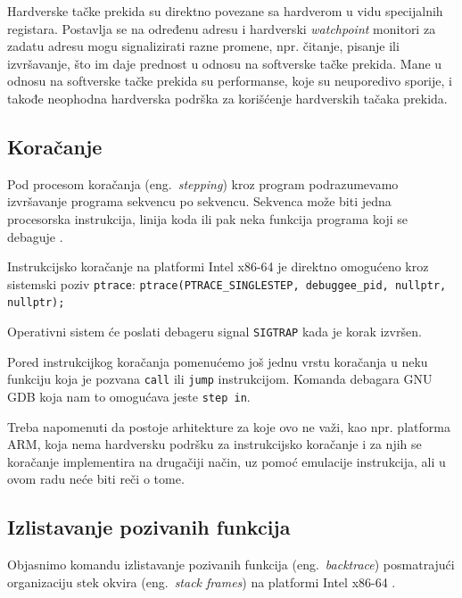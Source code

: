 \documentclass[12pt,oneside]{memoir}
\begin{document}
Hardverske tačke prekida su direktno povezane sa hardverom u vidu specijalnih registara. Postavlja se na određenu adresu i hardverski \emph{watchpoint} monitori za zadatu adresu mogu signalizirati razne promene, npr. čitanje, pisanje ili izvršavanje, što im daje prednost u odnosu na softverske tačke prekida. Mane u odnosu na softverske tačke prekida su performanse, koje su neuporedivo sporije, i takođe neophodna hardverska podrška za korišćenje hardverskih tačaka prekida.

\subsection{Koračanje}

Pod procesom koračanja (eng.~\emph{stepping}) kroz program podrazumevamo izvršavanje programa sekvencu po sekvencu. Sekvenca može biti jedna procesorska instrukcija, linija koda ili pak neka funkcija programa koji se debaguje \cite{GDB}.

Instrukcijsko koračanje na platformi Intel x86-64 je direktno omogućeno kroz sistemski poziv \texttt{ptrace}:\newline\newline
\texttt{ptrace(PTRACE\_SINGLESTEP, debuggee\_pid, nullptr, nullptr);}
\newline

Operativni sistem će poslati debageru signal \texttt{SIGTRAP} kada je korak izvršen.

Pored instrukcijkog koračanja pomenućemo još jednu vrstu koračanja u neku funkciju koja je pozvana \texttt{call} ili \texttt{jump} instrukcijom. Komanda debagara GNU GDB koja nam to omogućava jeste \texttt{step in}.

Treba napomenuti da postoje arhitekture za koje ovo ne važi, kao npr. platforma ARM, koja nema hardversku podršku za instrukcijsko koračanje i za njih se koračanje implementira na drugačiji način, uz pomoć emulacije instrukcija, ali u ovom radu neće biti reči o tome.

\subsection{Izlistavanje pozivanih funkcija}

Objasnimo komandu izlistavanje pozivanih funkcija (eng.~\emph{backtrace}) posmatrajući organizaciju stek okvira (eng.~\emph{stack frames}) na platformi Intel x86-64 \cite{GDB}.
\end{document}
